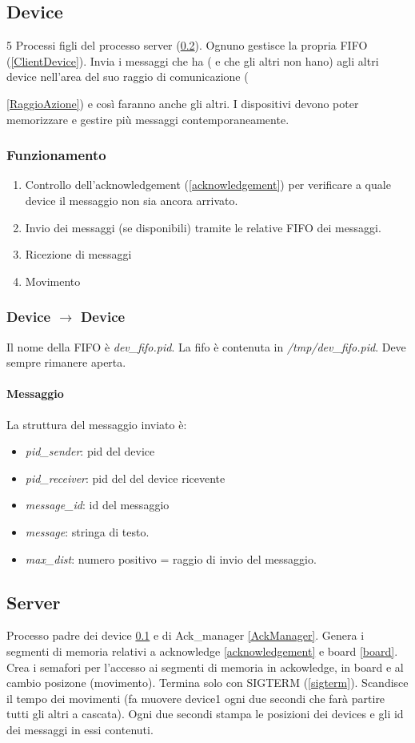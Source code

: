\documentclass[10pt,a4paper]{article}
\begin{document}
\subsection{Device} \label{device}
5 Processi figli del processo server (\ref{server}). Ognuno gestisce la propria FIFO (\ref{ClientDevice}).
Invia i messaggi che ha ( e che gli altri non hano) agli altri device nell'area del suo raggio di comunicazione ({\ref{RaggioAzione}) e così faranno anche gli altri.
I dispositivi devono poter memorizzare e gestire più messaggi contemporaneamente.
\subsubsection{Funzionamento}
\begin{enumerate}
\item Controllo dell'acknowledgement (\ref{acknowledgement}) per verificare a quale device il messaggio non sia ancora arrivato.
\item Invio dei messaggi (se disponibili) tramite le relative FIFO dei messaggi.
\item Ricezione di messaggi
\item Movimento
\end{enumerate}
\subsubsection{Device $\longrightarrow$ Device} 
Il nome della FIFO è \emph{dev\_fifo.pid}. La fifo è contenuta in \emph{/tmp/dev\_fifo.pid}. Deve sempre rimanere aperta.
\paragraph{Messaggio} 
La struttura del messaggio inviato è:
\begin{itemize}
\item \emph{pid\_sender}: pid del device
\item \emph{pid\_receiver}: pid del del device ricevente
\item \emph{message\_id}: id del messaggio
\item \emph{message}: stringa di testo.
\item \emph{max\_dist}: numero positivo = raggio di invio del messaggio. \label{RaggioAzione}
\end{itemize}

\subsection{Server} \label{server}
Processo padre dei device \ref{device} e di Ack\_manager \ref{AckManager}.
Genera i segmenti di memoria relativi a acknowledge \ref{acknowledgement} e board \ref{board}.
Crea i semafori per l'accesso ai segmenti di memoria in ackowledge, in board e al cambio posizone (movimento).  
Termina solo con SIGTERM (\ref{sigterm}). 
Scandisce il tempo dei movimenti (fa muovere device1 ogni due secondi che farà partire tutti gli altri a cascata).
Ogni due secondi stampa le posizioni dei devices e gli id dei messaggi in essi contenuti.
}
\end{document}
